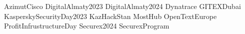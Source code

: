 \renewcommand\ExhibitGroup{Events}

{AzimutCisco}
{DigitalAlmaty2023}
{DigitalAlmaty2024}
{Dynatrace}
{GITEXDubai}
{KasperskySecurityDay2023}
{KazHackStan}
{MostHub}
{OpenTextEurope}
{ProfitInfrustructureDay}
{Securex2024}
{SecurexProgram}

